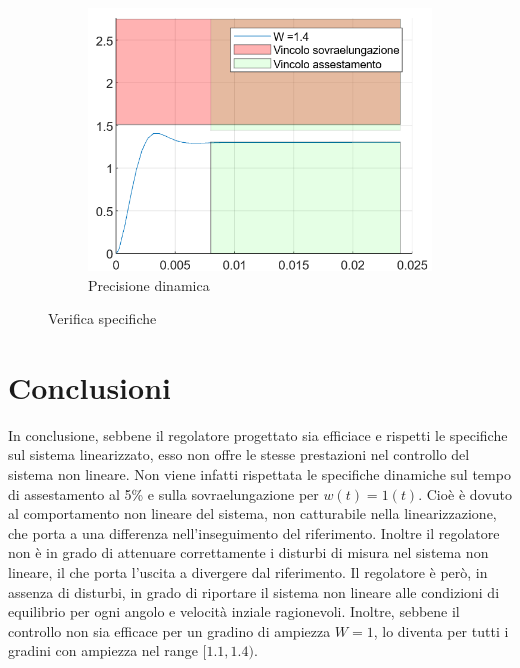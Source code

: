 \documentclass[a4paper, 11pt]{article}
\begin{document}
\begin{figure}[h!]
\begin{subfigure}[b]{0.3\textwidth}
		\centering
		\includegraphics[width=\textwidth]{./images/gradini_dinamico_high.png}
		\caption{Precisione dinamica}
		\label{fig:gradini_dinamico_high}
	\end{subfigure}
	
	\caption{Verifica specifiche}
	\label{fig:specifiche_gradini}
\end{figure}

\section{Conclusioni}

In conclusione, sebbene il regolatore progettato sia efficiace e rispetti le specifiche sul sistema linearizzato, esso non offre le stesse prestazioni nel controllo del sistema non lineare. Non viene infatti rispettata le specifiche dinamiche sul tempo di assestamento al 5\% e sulla sovraelungazione per $w(t) = 1(t)$. Cioè è dovuto al comportamento non lineare del sistema, non catturabile nella linearizzazione, che porta a una differenza nell'inseguimento del riferimento.
Inoltre il regolatore non è in grado di attenuare correttamente i disturbi di misura nel sistema non lineare, il che porta l'uscita a divergere dal riferimento.
Il regolatore è però, in assenza di disturbi, in grado di riportare il sistema non lineare alle condizioni di equilibrio per ogni angolo e velocità inziale ragionevoli.
Inoltre, sebbene il controllo non sia efficace per un gradino di ampiezza $W=1$, lo diventa per tutti i gradini con ampiezza nel range $[1.1, 1.4)$.
\end{document}
